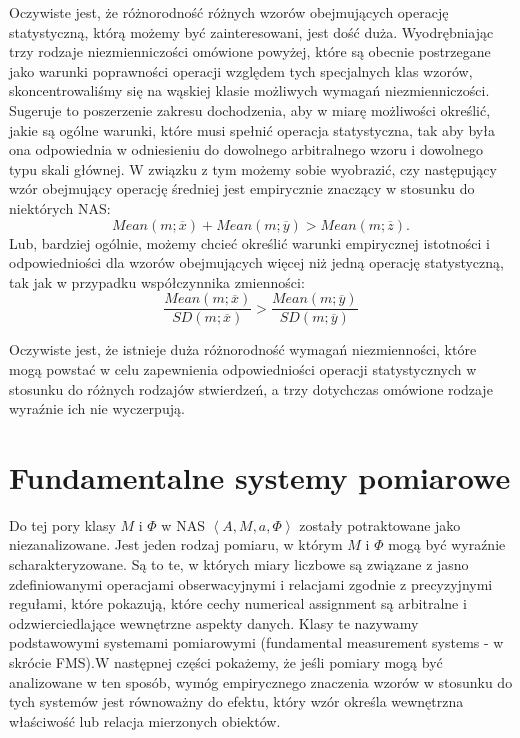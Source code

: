 \documentclass[12pt,a4paper]{report}
\newcommand{\tuple}[1]{\left\langle {#1} \right\rangle}
\begin{document}
Oczywiste jest, że różnorodność różnych wzorów obejmujących operację statystyczną, którą możemy być zainteresowani, jest dość duża. Wyodrębniając trzy rodzaje niezmienniczości omówione powyżej, które są obecnie postrzegane jako warunki poprawności operacji względem tych specjalnych klas wzorów, skoncentrowaliśmy się na wąskiej klasie możliwych wymagań niezmienniczości. Sugeruje to poszerzenie zakresu dochodzenia, aby w miarę możliwości określić, jakie są ogólne warunki, które musi spełnić operacja statystyczna, tak aby była ona odpowiednia w odniesieniu do dowolnego arbitralnego wzoru i dowolnego typu skali głównej. W związku z tym możemy sobie wyobrazić, czy następujący wzór obejmujący operację średniej jest empirycznie znaczący w stosunku do niektórych NAS:
\begin{equation*}
Mean(m;\overline{x})+Mean(m;\overline{y})>Mean(m;\overline{z}).
\end{equation*}
Lub, bardziej ogólnie, możemy chcieć określić warunki empirycznej istotności i odpowiedniości dla wzorów obejmujących więcej niż jedną operację statystyczną, tak jak w przypadku współczynnika zmienności:
\begin{equation*}
\frac{Mean(m;\overline{x})}{SD(m;\overline{x})} > \frac{Mean(m;\overline{y})}{SD(m;\overline{y})}
\end{equation*}


Oczywiste jest, że istnieje duża różnorodność wymagań niezmienności, które mogą powstać w celu zapewnienia odpowiedniości operacji statystycznych w stosunku do różnych rodzajów stwierdzeń, a trzy dotychczas omówione rodzaje wyraźnie ich nie wyczerpują.
\section{Fundamentalne systemy pomiarowe}

Do tej pory klasy $M$ i $\Phi$ w NAS $\tuple{A,M,a,\Phi}$ zostały potraktowane jako niezanalizowane. Jest jeden rodzaj pomiaru, w którym $M$ i $\Phi$ mogą być wyraźnie scharakteryzowane. Są to te, w których miary liczbowe są związane z jasno zdefiniowanymi operacjami obserwacyjnymi i relacjami zgodnie z precyzyjnymi regułami, które pokazują, które cechy numerical assignment są arbitralne i odzwierciedlające wewnętrzne aspekty danych. Klasy te nazywamy podstawowymi systemami pomiarowymi (fundamental measurement systems - w skrócie FMS).W następnej części pokażemy, że jeśli pomiary mogą być analizowane w ten sposób, wymóg empirycznego znaczenia wzorów w stosunku do tych systemów jest równoważny do efektu, który wzór określa wewnętrzna właściwość lub relacja mierzonych obiektów.
\end{document}
